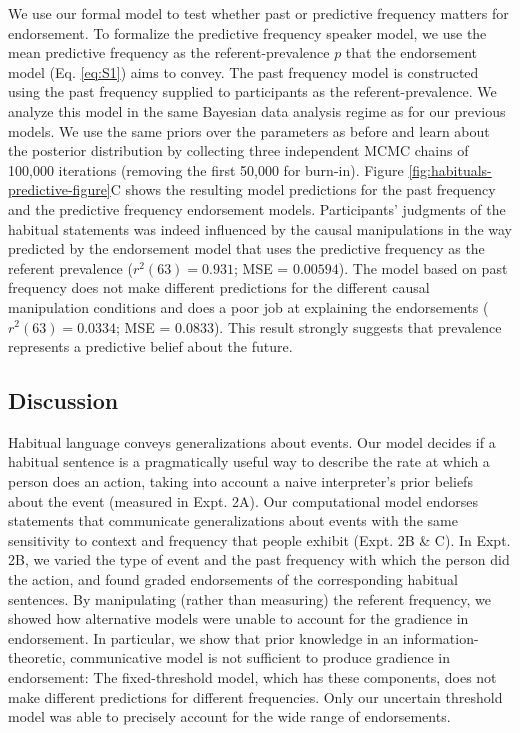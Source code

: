 \documentclass[english,,man,floatsintext]{apa6}
\theoremstyle{definition}
\theoremstyle{definition}
\theoremstyle{definition}
\theoremstyle{remark}
\begin{document}
We use our formal model to test whether past or predictive frequency
matters for endorsement. To formalize the predictive frequency speaker
model, we use the mean predictive frequency as the referent-prevalence
\(p\) that the endorsement model (Eq. \ref{eq:S1}) aims to convey. The
past frequency model is constructed using the past frequency supplied to
participants as the referent-prevalence. We analyze this model in the
same Bayesian data analysis regime as for our previous models. We use
the same priors over the parameters as before and learn about the
posterior distribution by collecting three independent MCMC chains of
100,000 iterations (removing the first 50,000 for burn-in). Figure
\ref{fig:habituals-predictive-figure}C shows the resulting model
predictions for the past frequency and the predictive frequency
endorsement models. Participants' judgments of the habitual statements
was indeed influenced by the causal manipulations in the way predicted
by the endorsement model that uses the predictive frequency as the
referent prevalence (\(r^2(63) = 0.931\); MSE = \(0.00594\)). The model
based on past frequency does not make different predictions for the
different causal manipulation conditions and does a poor job at
explaining the endorsements (\(r^2(63) = 0.0334\); MSE = \(0.0833\)).
This result strongly suggests that prevalence represents a predictive
belief about the future.

\hypertarget{discussion-2}{%
\subsection{Discussion}\label{discussion-2}}

Habitual language conveys generalizations about events. Our model
decides if a habitual sentence is a pragmatically useful way to describe
the rate at which a person does an action, taking into account a naive
interpreter's prior beliefs about the event (measured in Expt. 2A). Our
computational model endorses statements that communicate generalizations
about events with the same sensitivity to context and frequency that
people exhibit (Expt. 2B \& C). In Expt. 2B, we varied the type of event
and the past frequency with which the person did the action, and found
graded endorsements of the corresponding habitual sentences. By
manipulating (rather than measuring) the referent frequency, we showed
how alternative models were unable to account for the gradience in
endorsement. In particular, we show that prior knowledge in an
information-theoretic, communicative model is not sufficient to produce
gradience in endorsement: The fixed-threshold model, which has these
components, does not make different predictions for different
frequencies. Only our uncertain threshold model was able to precisely
account for the wide range of endorsements.
\end{document}
